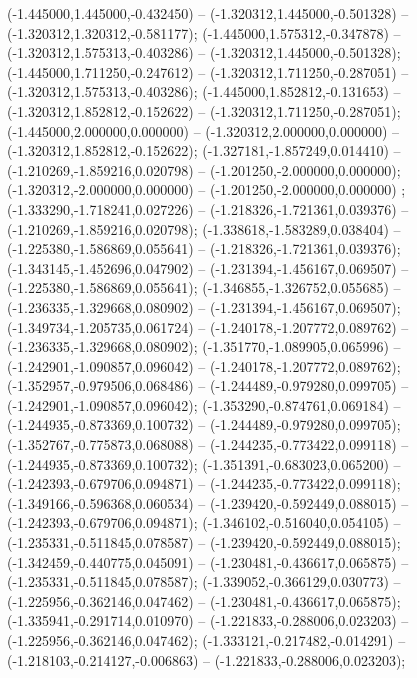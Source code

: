  (-1.445000,1.445000,-0.432450) -- (-1.320312,1.445000,-0.501328) -- (-1.320312,1.320312,-0.581177);
 (-1.445000,1.575312,-0.347878) -- (-1.320312,1.575313,-0.403286) -- (-1.320312,1.445000,-0.501328);
 (-1.445000,1.711250,-0.247612) -- (-1.320312,1.711250,-0.287051) -- (-1.320312,1.575313,-0.403286);
 (-1.445000,1.852812,-0.131653) -- (-1.320312,1.852812,-0.152622) -- (-1.320312,1.711250,-0.287051);
 (-1.445000,2.000000,0.000000) -- (-1.320312,2.000000,0.000000) -- (-1.320312,1.852812,-0.152622);
 (-1.327181,-1.857249,0.014410) -- (-1.210269,-1.859216,0.020798) -- (-1.201250,-2.000000,0.000000);
 (-1.320312,-2.000000,0.000000) -- (-1.201250,-2.000000,0.000000) ;
 (-1.333290,-1.718241,0.027226) -- (-1.218326,-1.721361,0.039376) -- (-1.210269,-1.859216,0.020798);
 (-1.338618,-1.583289,0.038404) -- (-1.225380,-1.586869,0.055641) -- (-1.218326,-1.721361,0.039376);
 (-1.343145,-1.452696,0.047902) -- (-1.231394,-1.456167,0.069507) -- (-1.225380,-1.586869,0.055641);
 (-1.346855,-1.326752,0.055685) -- (-1.236335,-1.329668,0.080902) -- (-1.231394,-1.456167,0.069507);
 (-1.349734,-1.205735,0.061724) -- (-1.240178,-1.207772,0.089762) -- (-1.236335,-1.329668,0.080902);
 (-1.351770,-1.089905,0.065996) -- (-1.242901,-1.090857,0.096042) -- (-1.240178,-1.207772,0.089762);
 (-1.352957,-0.979506,0.068486) -- (-1.244489,-0.979280,0.099705) -- (-1.242901,-1.090857,0.096042);
 (-1.353290,-0.874761,0.069184) -- (-1.244935,-0.873369,0.100732) -- (-1.244489,-0.979280,0.099705);
 (-1.352767,-0.775873,0.068088) -- (-1.244235,-0.773422,0.099118) -- (-1.244935,-0.873369,0.100732);
 (-1.351391,-0.683023,0.065200) -- (-1.242393,-0.679706,0.094871) -- (-1.244235,-0.773422,0.099118);
 (-1.349166,-0.596368,0.060534) -- (-1.239420,-0.592449,0.088015) -- (-1.242393,-0.679706,0.094871);
 (-1.346102,-0.516040,0.054105) -- (-1.235331,-0.511845,0.078587) -- (-1.239420,-0.592449,0.088015);
 (-1.342459,-0.440775,0.045091) -- (-1.230481,-0.436617,0.065875) -- (-1.235331,-0.511845,0.078587);
 (-1.339052,-0.366129,0.030773) -- (-1.225956,-0.362146,0.047462) -- (-1.230481,-0.436617,0.065875);
 (-1.335941,-0.291714,0.010970) -- (-1.221833,-0.288006,0.023203) -- (-1.225956,-0.362146,0.047462);
 (-1.333121,-0.217482,-0.014291) -- (-1.218103,-0.214127,-0.006863) -- (-1.221833,-0.288006,0.023203);
